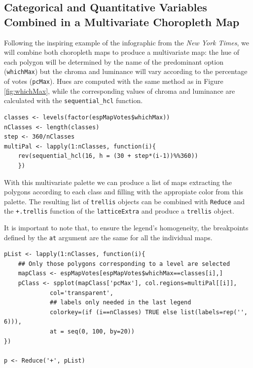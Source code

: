 \subsection{\floweroneleft Categorical and Quantitative Variables Combined in a Multivariate Choropleth Map}
\label{sec-1-3}
Following the inspiring example of the infographic from the \emph{New
York Times}, we will combine both choropleth maps to produce a
multivariate map: the hue of each polygon will be determined by
the name of the predominant option (\texttt{whichMax}) but the chroma and
luminance will vary according to the percentage of votes
(\texttt{pcMax}). Hues are computed with the same method as in Figure
\ref{fig:whichMax}, while the corresponding values of chroma and
luminance are calculated with the \texttt{sequential\_hcl} function.

\lstset{language=R,numbers=none}
\begin{lstlisting}
classes <- levels(factor(espMapVotes$whichMax))
nClasses <- length(classes)
step <- 360/nClasses
multiPal <- lapply(1:nClasses, function(i){
    rev(sequential_hcl(16, h = (30 + step*(i-1))%%360))
    })
\end{lstlisting}

With this multivariate palette we can produce a list of maps
extracting the polygons according to each class and filling with
the appropiate color from this palette. The resulting list of
\texttt{trellis} objects can be combined with \texttt{Reduce} and the
\texttt{+.trellis} function of the \texttt{latticeExtra} and produce a \texttt{trellis}
object.

It is important to note that, to ensure the legend's homogeneity, the
breakpoints defined by the \texttt{at} argument are the same for all the
individual maps.

 
\lstset{language=R,numbers=none}
\begin{lstlisting}
pList <- lapply(1:nClasses, function(i){
    ## Only those polygons corresponding to a level are selected
    mapClass <- espMapVotes[espMapVotes$whichMax==classes[i],]
    pClass <- spplot(mapClass['pcMax'], col.regions=multiPal[[i]],
		     col='transparent',
		     ## labels only needed in the last legend
		     colorkey=(if (i==nClasses) TRUE else list(labels=rep('', 6))),
		     at = seq(0, 100, by=20))
})

p <- Reduce('+', pList)
\end{lstlisting}

